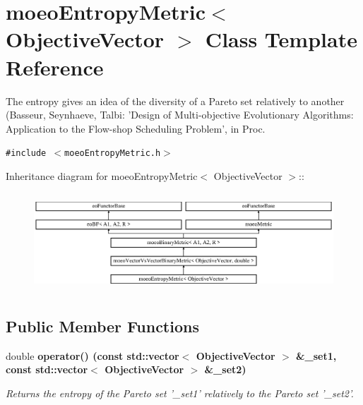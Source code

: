\section{moeo\-Entropy\-Metric$<$ Objective\-Vector $>$ Class Template Reference}
\label{classmoeoEntropyMetric}
The entropy gives an idea of the diversity of a Pareto set relatively to another (Basseur, Seynhaeve, Talbi: 'Design of Multi-objective Evolutionary Algorithms: Application to the Flow-shop Scheduling Problem', in Proc.  


{\tt \#include $<$moeo\-Entropy\-Metric.h$>$}

Inheritance diagram for moeo\-Entropy\-Metric$<$ Objective\-Vector $>$::\begin{figure}[H]
\begin{center}
\leavevmode
\includegraphics[height=3.71353cm]{classmoeoEntropyMetric}
\end{center}
\end{figure}
\subsection*{Public Member Functions}
\begin{CompactItemize}
\item 
double \bf{operator()} (const std::vector$<$ Objective\-Vector $>$ \&\_\-set1, const std::vector$<$ Objective\-Vector $>$ \&\_\-set2)
\begin{CompactList}\small\item\em Returns the entropy of the Pareto set '\_\-set1' relatively to the Pareto set '\_\-set2'. \item\end{CompactList}\end{CompactItemize}
